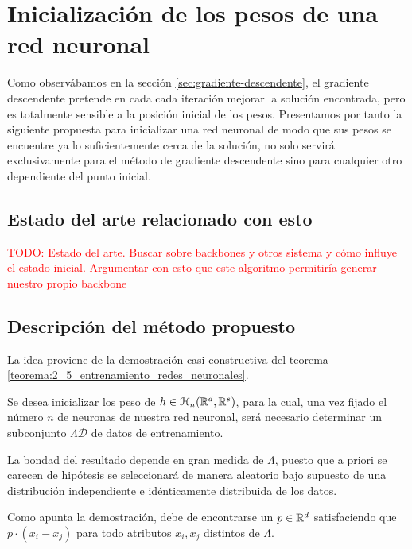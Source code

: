 
\section{ Inicialización de los pesos de una red neuronal}  

Como observábamos en la sección \ref{sec:gradiente-descendente}, el gradiente descendente pretende en cada 
cada iteración mejorar la solución encontrada, pero es 
totalmente sensible a la posición inicial 
de los pesos. 
Presentamos por tanto la siguiente propuesta para inicializar una red neuronal de modo que sus pesos se encuentre ya lo suficientemente cerca de la solución, 
no solo servirá exclusivamente para el método de gradiente descendente 
sino para cualquier otro dependiente del punto inicial. 

\subsection{ Estado del arte relacionado con esto} 

\textcolor{red}{TODO: Estado del arte. Buscar sobre backbones y otros
sistema y cómo influye el estado inicial. Argumentar con esto 
que este algoritmo permitiría generar nuestro propio backbone}

\subsection{Descripción del método propuesto}

La idea proviene de la demostración casi constructiva del teorema \ref{teorema:2_5_entrenamiento_redes_neuronales}.

Se desea inicializar los peso de $h \in \mathcal{H}_n(\mathbb{R}^d,\mathbb{R}^s)$, para la cual, una vez fijado el número $n$ de neuronas de nuestra red neuronal, será necesario  determinar un subconjunto $\Lambda \mathcal{D}$ de datos de entrenamiento. 

La bondad del resultado depende en gran medida de $\Lambda$, 
puesto que a priori se carecen de hipótesis se seleccionará 
de manera aleatorio bajo supuesto de una distribución 
independiente e idénticamente distribuida de los datos. 

Como apunta la demostración, debe de encontrarse un 
$p \in \mathbb{R}^d$ satisfaciendo que $p \cdot (x_i-x_j)$ para todo
atributos $x_i,x_j$ distintos de $\Lambda$.  

